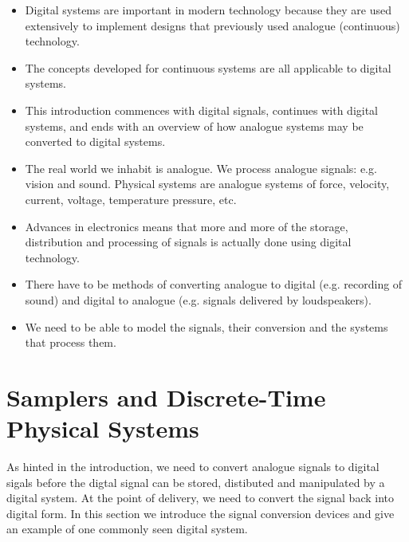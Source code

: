 \def\FileDate{98/11/04}
\def\FileVersion{1.0}

\begin{slide}\label{slide:l7s1}
\begin{itemize}
\item Digital systems are important in modern technology because they
  are used extensively to implement designs that previously used
  analogue (continuous) technology.
\item The concepts developed for continuous systems
  are all applicable to digital systems.
\item This introduction commences with digital signals, continues with
  digital systems, and ends with an overview of how analogue systems
  may be converted to digital systems.
\end{itemize}
\end{slide}

\begin{slide}\label{slide:l7s1a}
\begin{itemize}
\item The real world we inhabit is analogue. We process analogue
  signals: e.g. vision and sound. Physical systems are analogue
  systems of force, velocity, current, voltage, temperature pressure,
  etc.
\item Advances in electronics means that more and more of the storage,
  distribution and processing of signals is actually done using
  digital technology.
\item There have to be methods of converting analogue to digital (e.g.
  recording of sound) and digital to analogue (e.g. signals delivered
  by loudspeakers).
\item We need to be able to model the signals, their conversion and
  the systems that process them.
\end{itemize}
\end{slide}

\section*{Samplers and Discrete-Time Physical Systems}

As hinted in the introduction, we need to convert analogue signals to
digital sigals before the digtal signal can be stored, distibuted and
manipulated by a digital system. At the point of delivery, we need to
convert the signal back into digital form. In this section we
introduce the signal conversion devices and give an example of one
commonly seen digital system.

